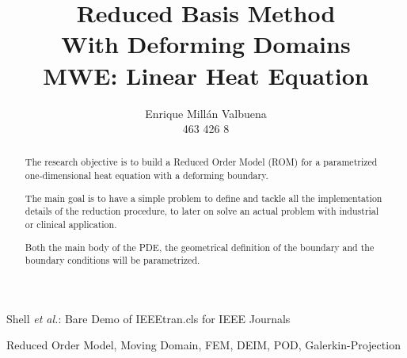 \documentclass[a4paper, technote, compsoc]{IEEEtran}
\begin{document}
\onecolumn

\title{Reduced Basis Method \\ With Deforming Domains \\ \large{MWE: Linear Heat Equation}}

\author{Enrique Millán Valbuena \\ \normalsize{463 426 8}}%
        
{Shell \MakeLowercase{\textit{et al.}}: Bare Demo of IEEEtran.cls for IEEE Journals}

\maketitle

\begin{abstract}
   The research objective is to build a Reduced Order Model (ROM) for a parametrized one-dimensional heat equation with a deforming boundary.

   The main goal is to have a simple problem to define and tackle all the implementation details of the reduction procedure, 
   to later on solve an actual problem with industrial or clinical application. 

   Both the main body of the PDE, the geometrical definition of the boundary and the boundary conditions will be parametrized.
   
\end{abstract}

\begin{IEEEkeywords}
    Reduced Order Model, Moving Domain, FEM, DEIM, POD, Galerkin-Projection
\end{IEEEkeywords}
\tableofcontents
\twocolumn

\newpage


\newpage

\end{document}
